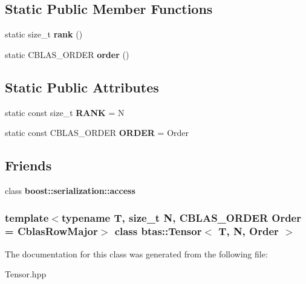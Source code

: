 \subsection*{Static Public Member Functions}
\begin{DoxyCompactItemize}
\item 
\hypertarget{classbtas_1_1_tensor_a0fcec1a57766cc215ee0f2f10002f55f}{
static size\_\-t {\bfseries rank} ()}
\label{classbtas_1_1_tensor_a0fcec1a57766cc215ee0f2f10002f55f}

\item 
\hypertarget{classbtas_1_1_tensor_a87af5916939f6e36a761d4cdce8992f0}{
static CBLAS\_\-ORDER {\bfseries order} ()}
\label{classbtas_1_1_tensor_a87af5916939f6e36a761d4cdce8992f0}

\end{DoxyCompactItemize}
\subsection*{Static Public Attributes}
\begin{DoxyCompactItemize}
\item 
\hypertarget{classbtas_1_1_tensor_a26bfe9073464479c7811f41f2888258d}{
static const size\_\-t {\bfseries RANK} = N}
\label{classbtas_1_1_tensor_a26bfe9073464479c7811f41f2888258d}

\item 
\hypertarget{classbtas_1_1_tensor_a3e79c525f8de1712bf8086a63fe0dbae}{
static const CBLAS\_\-ORDER {\bfseries ORDER} = Order}
\label{classbtas_1_1_tensor_a3e79c525f8de1712bf8086a63fe0dbae}

\end{DoxyCompactItemize}
\subsection*{Friends}
\begin{DoxyCompactItemize}
\item 
\hypertarget{classbtas_1_1_tensor_ac98d07dd8f7b70e16ccb9a01abf56b9c}{
class {\bfseries boost::serialization::access}}
\label{classbtas_1_1_tensor_ac98d07dd8f7b70e16ccb9a01abf56b9c}

\end{DoxyCompactItemize}
\subsubsection*{template$<$typename T, size\_\-t N, CBLAS\_\-ORDER Order = CblasRowMajor$>$ class btas::Tensor$<$ T, N, Order $>$}



The documentation for this class was generated from the following file:\begin{DoxyCompactItemize}
\item 
Tensor.hpp\end{DoxyCompactItemize}
